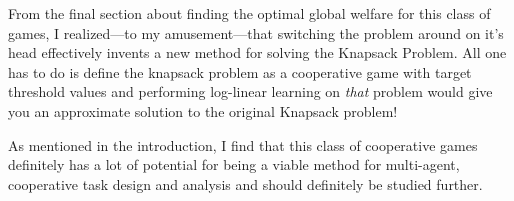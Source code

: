 \documentclass[11pt, onecolumn, compsoc, letterpaper]{article}
\begin{document}
From the final section about finding the optimal global welfare for this class of games, I realized---to my amusement---that switching the problem around on it's head effectively invents a new method for solving the Knapsack Problem. All one has to do is define the knapsack problem as a cooperative game with target threshold values and performing log-linear learning on \emph{that} problem would give you an approximate solution to the original Knapsack problem!

As mentioned in the introduction, I find that this class of cooperative games definitely has a lot of potential for being a viable method for multi-agent, cooperative task design and analysis and should definitely be studied further.




\end{document}
